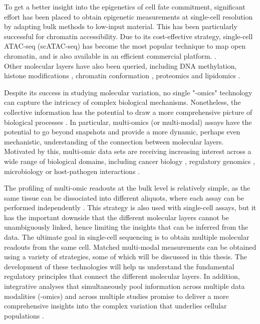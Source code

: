 To get a better insight into the epigenetics of cell fate commitment, significant effort has been placed to obtain epigenetic measurements at single-cell resolution by adapting bulk methods to low-input material. This has been particularly successful for chromatin accessibility. Due to its cost-effective strategy, single-cell ATAC-seq (scATAC-seq) has become the most popular technique to map open chromatin, and is also available in an efficient commercial platform. \cite{Cusanovich2015,Cao2018,Chen2018}.\\
Other molecular layers have also been queried, including DNA methylation\cite{Smallwood2014}, histone modifications \cite{Ku2019}, chromatin conformation \cite{Ku2019}, proteomics \cite{Specht2018} and lipidomics \cite{Thiele2019}.

Despite its success in studying molecular variation, no single "-omics" technology can capture the intricacy of complex biological mechanisms. Nonetheless, the collective information has the potential to draw a more comprehensive picture of biological processes \cite{Hasin2017,Ritchie2015}. In particular, multi-omics (or multi-modal) assays have the potential to go beyond snapshots and provide a more dynamic, perhaps even mechanistic, understanding of the connection between molecular layers. Motivated by this, multi-omic data sets are receiving increasing interest across a wide range of biological domains, including cancer biology \cite{Akavia2010,Gerstung2015}, regulatory genomics \cite{Chen2016}, microbiology \cite{Kim2016} or host-pathogen interactions \cite{Soderholm2016}. 

The profiling of multi-omic readouts at the bulk level is relatively simple, as the same tissue can be dissociated into different aliquots, where each assay can be performed independently \cite{Ritchie2015}. This strategy is also used with single-cell assays, but it has the important downside that the different molecular layers cannot be unambiguously linked, hence limiting the insights that can be inferred from the data. The ultimate goal in single-cell sequencing is to obtain multiple molecular readouts from the same cell. Matched multi-modal measurements can be obtained using a variety of strategies, some of which will be discussed in this thesis. The development of these technologies will help us understand the fundamental regulatory principles that connect the different molecular layers. In addition, integrative analyses that simultaneously pool information across multiple data modalities (-omics) and across multiple studies promise to deliver a more comprehensive insights into the complex variation that underlies cellular populations \cite{Stuart2019,Colome-Tatche2018}.

